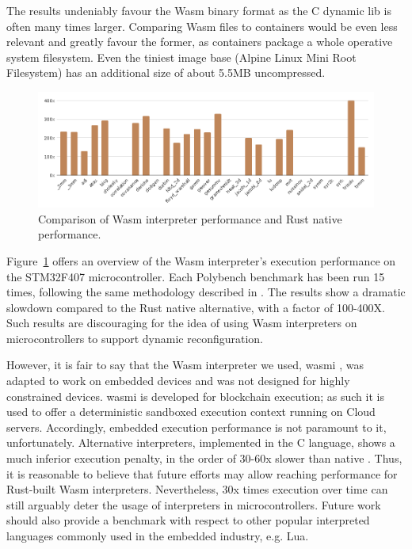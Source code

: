The results undeniably favour the Wasm binary format as the C dynamic lib is often many times larger. Comparing Wasm files to containers would be even less relevant and greatly favour the former, as containers package a whole operative system filesystem. Even the tiniest image base (Alpine Linux Mini Root Filesystem) has an additional size of about 5.5MB uncompressed.

\begin{figure}[ht]
\centering
\includegraphics[width=\columnwidth]{figures/b-wasmi-4}
\caption{Comparison of Wasm interpreter performance and Rust native performance.} \label{fig:b-wasmi-4}
\end{figure}

Figure~\ref{fig:b-wasmi-4} offers an overview of the Wasm interpreter's execution performance on the STM32F407 microcontroller. Each Polybench benchmark has been run 15 times, following the same methodology described in \cite{wasm3-performance}. The results show a dramatic slowdown compared to the Rust native alternative, with a factor of 100-400X. Such results are discouraging for the idea of using Wasm interpreters on microcontrollers to support dynamic reconfiguration.

However, it is fair to say that the Wasm interpreter we used, wasmi \cite{wasmi}, was adapted to work on embedded devices and was not designed for highly constrained devices. wasmi is developed for blockchain execution; as such it is used to offer a deterministic sandboxed execution context running on Cloud servers. Accordingly, embedded execution performance is not paramount to it, unfortunately. Alternative interpreters, implemented in the C language, shows a much inferior  execution penalty, in the order of 30-60x slower than native \cite{peach2020ewasm}. Thus, it is reasonable to believe that future efforts may allow reaching performance for Rust-built Wasm interpreters. Nevertheless, 30x times execution over time can still arguably deter the usage of interpreters in microcontrollers. Future work should also provide a benchmark with respect to other popular interpreted languages commonly used in the embedded industry, e.g. Lua.

